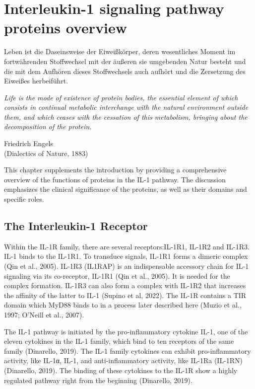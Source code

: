 \chapter{Interleukin-1 signaling pathway proteins overview}
\label{chapter:proteins}
\epigraph{Leben ist die Daseinsweise der Eiweißkörper, deren wesentliches Moment im fortwährenden Stoffwechsel mit der äußeren sie umgebenden Natur besteht und die mit dem Aufhören dieses Stoffwechsels auch aufhört und die Zersetzung des Eiweißes herbeiführt. \par \vspace{\baselineskip}
\emph{Life is the mode of existence of protein bodies, the essential element of which consists in continual metabolic interchange with the natural environment outside them, and which ceases with the cessation of this metabolism, bringing about the decomposition of the protein.}}{Friedrich Engels\\(Dialectics of Nature, 1883​​)}

This chapter supplements the introduction by providing a comprehensive overview of the functions of proteins in the IL-1 pathway. The discussion emphasizes the clinical significance of the proteins, as well as their domains and specific roles.

\section{The Interleukin-1 Receptor}
\label{section:IL1}
Within the IL-1R family, there are several receptors:IL-1R1, IL-1R2 and IL-1R3. IL-1{\textbeta} binds to the IL-1R1. To transduce signals, IL-1R1 forms a dimeric complex (Qin et al., 2005). IL-1R3 (IL1RAP) is an indispensable accessory chain for IL-1 signaling via its co-receptor, IL-1R1 (Qin et al., 2005). It is needed for the complex formation. IL-1R3 can also form a complex with IL-1R2 that increases the affinity of the latter to IL-1 (Supino et al, 2022). The IL-1R contains a TIR domain which MyD88 binds to in a process later described here (Muzio et al., 1997; O’Neill et al., 2007).

The IL-1 pathway is initiated by the pro-inflammatory cytokine IL-1{\textbeta}, one of the eleven cytokines in the IL-1 family, which bind to ten receptors of the same family (Dinarello, 2019). The IL-1 family cytokines can exhibit pro-inflammatory activity, like IL-1α, IL-1{\textbeta}, and anti-inflammatory activity, like IL-1Ra (IL-1RN) (Dinarello, 2019). The binding of these cytokines to the IL-1R show a highly regulated pathway right from the beginning (Dinarello, 2019).

